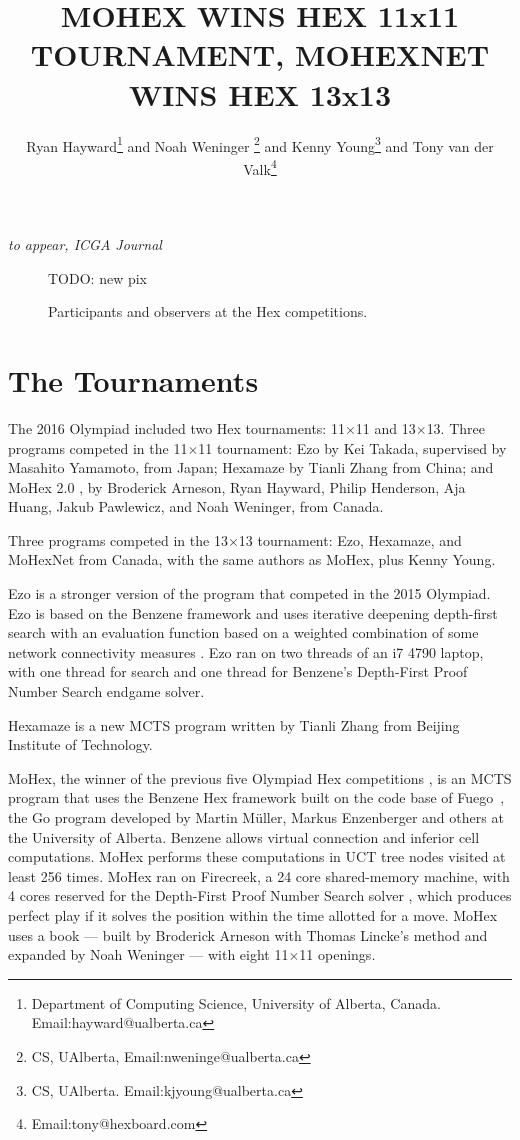 \documentclass{icga}
\title{\sc MOHEX WINS HEX 11x11 TOURNAMENT, MOHEXNET WINS HEX 13x13}
\author{Ryan Hayward\thanks{Department 
of Computing Science, University of Alberta, Canada. Email:hayward@ualberta.ca} and
Noah Weninger \thanks{CS, UAlberta, Email:nweninge@ualberta.ca} and
Kenny Young\thanks{CS, UAlberta. Email:kjyoung@ualberta.ca} and
Tony van der Valk\thanks{Email:tony@hexboard.com}
}
\affiliation{Edmonton, Canada}
\newif\iflong\longfalse  %
\def\Eo{\mbox{\sc Ezo}}
\def\Hz{\mbox{\sc Hexamaze}}
\def\Mx{\mbox{\sc MoHex}}
\def\Mt{\mbox{\sc MoHexNet}}
\def\Fuego{\mbox{\sc Fuego}}
\begin{document}
\maketitle

\iflong
In the longer version of the report, we include all games.
\fi

\vspace*{-2.25in}
{\it to appear, ICGA Journal}
\vspace*{2.0in}

\begin{figure}[hbt]
TODO: new pix

\caption{Participants and observers at the Hex competitions.}
\end{figure}


\section{The Tournaments}
The 2016 Olympiad included
two Hex tournaments: 11$\times$11 and 13$\times$13.
Three programs competed in the 11$\times$11 tournament:
\Eo{} by Kei Takada, supervised by Masahito Yamamoto, from Japan;
\Hz{} by Tianli Zhang from China; and
\Mx{} 2.0 , 
by Broderick Arneson, Ryan Hayward, Philip Henderson, Aja Huang, 
Jakub Pawlewicz, and Noah Weninger, from Canada.

Three programs competed in the 13$\times$13 tournament:
\Eo{}, \Hz{}, and \Mt{} from Canada,
with the same authors as \Mx{}, plus Kenny Young.

\Eo{} is a stronger version of the program that competed in the 2015 Olympiad.
\Eo{} is based on the Benzene framework and uses iterative deepening depth-first search with an evaluation function based on a weighted combination of some network connectivity measures .
\Eo{} ran on two threads of an i7 4790 laptop,
with one thread for search and one thread for
Benzene's Depth-First Proof Number Search endgame solver.

\Hz{} is a new MCTS program written by Tianli Zhang from 
Beijing Institute of Technology.

\Mx{}, the winner of the previous five Olympiad Hex competitions
,
is an MCTS program that uses the Benzene Hex framework
built on the code base of \Fuego\ ,
the Go program developed by Martin M\"{u}ller, Markus Enzenberger
and others at the University of Alberta.
Benzene allows virtual connection and
inferior cell computations.
\Mx{} performs these computations in UCT tree nodes visited at least 256 times.
\Mx{} ran on Firecreek, a 24 core shared-memory machine, 
with 4 cores reserved for the 
Depth-First Proof Number Search solver , which
produces perfect play if it solves the
position within the time allotted for a move.
\Mx{} uses a book ---
built by Broderick Arneson with Thomas Lincke's method 
and expanded by Noah Weninger ---
with eight 11$\times$11 openings.
\end{document}
